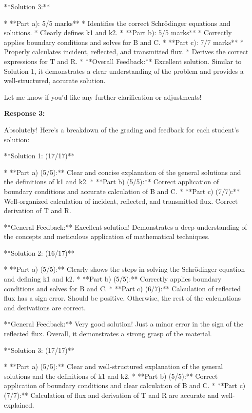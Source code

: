 \documentclass[a4paper,11pt]{article}
\begin{document}
**Solution 3:**

*   **Part a): 5/5 marks**
    *   Identifies the correct Schrödinger equations and solutions.
    *   Clearly defines k1 and k2.
*   **Part b): 5/5 marks**
    *   Correctly applies boundary conditions and solves for B and C.
*   **Part c): 7/7 marks**
    *   Properly calculates incident, reflected, and transmitted flux.
    *   Derives the correct expressions for T and R.
*   **Overall Feedback:** Excellent solution. Similar to Solution 1, it demonstrates a clear understanding of the problem and provides a well-structured, accurate solution.

Let me know if you'd like any further clarification or adjustments!

\bigskip    
\textbf{Response 3:}

Absolutely! Here's a breakdown of the grading and feedback for each student's solution:

**Solution 1: (17/17)**

*   **Part a) (5/5):** Clear and concise explanation of the general solutions and the definitions of k1 and k2.
*   **Part b) (5/5):** Correct application of boundary conditions and accurate calculation of B and C.
*   **Part c) (7/7):** Well-organized calculation of incident, reflected, and transmitted flux. Correct derivation of T and R.

**General Feedback:** Excellent solution! Demonstrates a deep understanding of the concepts and meticulous application of mathematical techniques.

**Solution 2: (16/17)**

*   **Part a) (5/5):**  Clearly shows the steps in solving the Schrödinger equation and defining k1 and k2.
*   **Part b) (5/5):** Correctly applies boundary conditions and solves for B and C.
*   **Part c) (6/7):** Calculation of reflected flux has a sign error. Should be positive. Otherwise, the rest of the calculations and derivations are correct.

**General Feedback:** Very good solution! Just a minor error in the sign of the reflected flux. Overall, it demonstrates a strong grasp of the material.

**Solution 3: (17/17)**

*   **Part a) (5/5):** Clear and well-structured explanation of the general solutions and the definitions of k1 and k2.
*   **Part b) (5/5):**  Correct application of boundary conditions and clear calculation of B and C.
*   **Part c) (7/7):**  Calculation of flux and derivation of T and R are accurate and well-explained.
\end{document}
